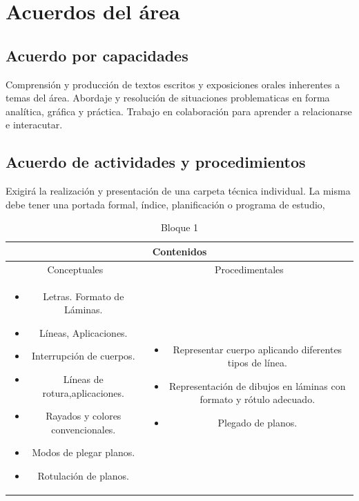 \documentclass[../main]{subfiles}
\begin{document}
\section{Acuerdos del área}
\subsection{Acuerdo por capacidades}
Comprensión y producción de textos escritos y exposiciones orales inherentes a temas del área.
Abordaje y resolución de situaciones problematicas en forma analítica, gráfica y práctica.
Trabajo en colaboración para aprender a relacionarse e interacutar.
\subsection{Acuerdo de actividades y procedimientos}
Exigirá la realización y presentación de una carpeta técnica individual. La misma debe tener una portada formal, índice, planificación o programa de estudio, 
\begin{table}[h]
    \centering
    \begin{tabular}{|c|c|} \hline
         \multicolumn{2}{|c|}{Contenidos} \\ \hline
         Conceptuales & Procedimentales  \\ \hline \hline
        \begin{minipage} [t] {0.4\textwidth} 
            \begin{itemize}
                \item Letras. Formato de Láminas.
                \item Líneas, Aplicaciones. 
                \item Interrupción de cuerpos.
                \item Líneas de rotura,aplicaciones.
                \item Rayados y colores convencionales.
                \item Modos de plegar planos.
                \item Rotulación de planos.
            \end{itemize}
        \end{minipage} &  \begin{minipage} [t] {0.4\textwidth} 
            \begin{itemize}
                \item Representar cuerpo aplicando diferentes tipos de línea.
                \item Representación de dibujos en láminas con formato y rótulo adecuado.
                \item Plegado de planos.
            \end{itemize}
        \end{minipage} \\ \hline
       \end{tabular}
    \caption{Bloque 1}
\end{table}
\end{document}
